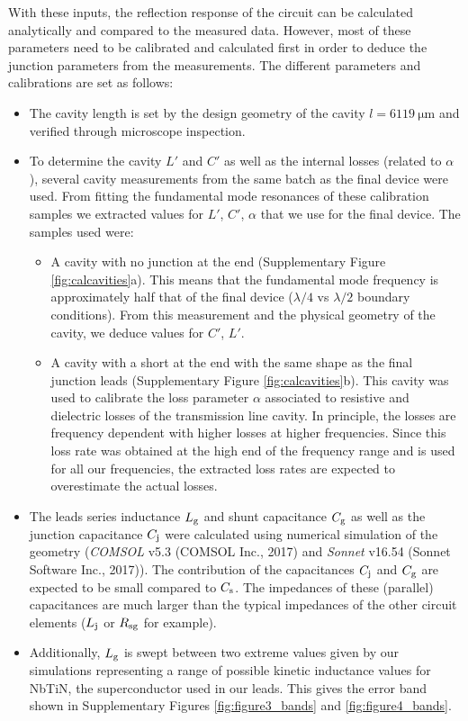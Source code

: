 With these inputs, the reflection response of the circuit can be calculated analytically and compared to the measured data.
However, most of these parameters need to be calibrated and calculated first in order to deduce the junction parameters from the measurements.
The different parameters and calibrations are set as follows:
\begin{itemize}
	\item The cavity length is set by the design geometry of the cavity $l=\SI{6119}{\micro\meter}$ and verified through microscope inspection.
	\item To determine the cavity $L'$ and $C'$ as well as the internal losses (related to $\alpha$), several cavity measurements from the same batch as the final device were used.
	From fitting the fundamental mode resonances of these calibration samples we extracted values for $L'$, $C'$, $\alpha$ that we use for the final device.
	The samples used were:
	\begin{itemize}
		\item A cavity with no junction at the end (Supplementary Figure \ref{fig:calcavities}a).
		This means that the fundamental mode frequency is approximately half that of the final device ($\lambda/4$ vs $\lambda/2$ boundary conditions).
		From this measurement and the physical geometry of the cavity, we deduce values for $C'$, $L'$.
		\item A cavity with a short at the end with the same shape as the final junction leads (Supplementary Figure \ref{fig:calcavities}b).
		This cavity was used to calibrate the loss parameter $\alpha$ associated to resistive and dielectric losses of the transmission line cavity.
		In principle, the losses are frequency dependent with higher losses at higher frequencies.
		Since this loss rate was obtained at the high end of the frequency range and is used for all our frequencies, the extracted loss rates are expected to overestimate the actual losses.
	\end{itemize}
	\item The leads series inductance $L_{\rm g}$ and shunt capacitance $C_{\rm g}$ as well as the junction capacitance $C_{\rm j}$ were calculated using numerical simulation of the geometry (\textit{COMSOL} v5.3 (COMSOL Inc., 2017) and \textit{Sonnet} v16.54 (Sonnet Software Inc., 2017)).
	The contribution of the capacitances $C_{\rm j}$ and $C_{\rm g}$ are expected to be small compared to $C_{\rm s}$.
	The impedances of these (parallel) capacitances are much larger than the typical impedances of the other circuit elements ($L_{\rm j}$ or $R_{\rm sg}$ for example).
	\item Additionally, $L_{\rm g}$ is swept between two extreme values given by our simulations representing a range of possible kinetic inductance values for NbTiN, the superconductor used in our leads.
	This gives the error band shown in Supplementary Figures \ref{fig:figure3_bands} and \ref{fig:figure4_bands}.
\end{itemize}






